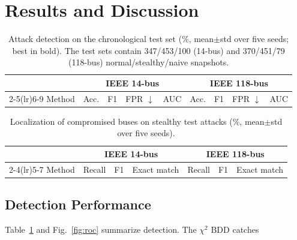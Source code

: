 \section{Results and Discussion}
\begin{table}[t]
\centering
\caption{Attack detection on the chronological test set (\%, mean$\pm$std over five seeds; best in bold). The test sets contain 347/453/100 (14-bus) and 370/451/79 (118-bus) normal/stealthy/naive snapshots.}
\label{tab:det}
\footnotesize
\setlength{\tabcolsep}{3.2pt}
\begin{tabular}{l cccc cccc}
\toprule
& \multicolumn{4}{c}{IEEE 14-bus} & \multicolumn{4}{c}{IEEE 118-bus}\\
\cmidrule(lr){2-5}\cmidrule(lr){6-9}
Method & Acc. & F1 & FPR $\downarrow$ & AUC & Acc. & F1 & FPR $\downarrow$ & AUC\\
\midrule

\bottomrule
\end{tabular}
\end{table}

\begin{table}[t]
\centering
\caption{Localization of compromised buses on stealthy test attacks (\%, mean$\pm$std over five seeds).}
\label{tab:loc}
\footnotesize
\begin{tabular}{l ccc ccc}
\toprule
& \multicolumn{3}{c}{IEEE 14-bus} & \multicolumn{3}{c}{IEEE 118-bus}\\
\cmidrule(lr){2-4}\cmidrule(lr){5-7}
Method & Recall & F1 & Exact match & Recall & F1 & Exact match\\
\midrule

\bottomrule
\end{tabular}
\end{table}

\subsection{Detection Performance}
Table~\ref{tab:det} and Fig.~\ref{fig:roc} summarize detection. The $\chi^2$ BDD catches %

